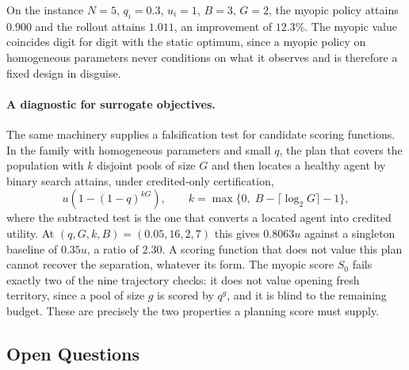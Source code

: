 On the instance $N=5$, $q_i=0.3$, $u_i=1$, $B=3$, $G=2$, the myopic policy
attains $0.900$ and the rollout attains $1.011$, an improvement of $12.3\%$. The
myopic value coincides digit for digit with the static optimum, since a myopic
policy on homogeneous parameters never conditions on what it observes and is
therefore a fixed design in disguise.

\paragraph{A diagnostic for surrogate objectives.}
The same machinery supplies a falsification test for candidate scoring
functions. In the family with homogeneous parameters and small $q$, the plan
that covers the population with $k$ disjoint pools of size $G$ and then locates a
healthy agent by binary search attains, under credited-only certification,
\[
  u\left(1-(1-q)^{kG}\right),
  \qquad k=\max\{0,\;B-\lceil\log_2 G\rceil-1\},
\]
where the subtracted test is the one that converts a located agent into credited
utility. At $(q,G,k,B)=(0.05,16,2,7)$ this gives $0.8063u$ against a singleton
baseline of $0.35u$, a ratio of $2.30$. A scoring function that does not value
this plan cannot recover the separation, whatever its form. The myopic score
$S_0$ fails exactly two of the nine trajectory checks: it does not value opening
fresh territory, since a pool of size $g$ is scored by $q^{g}$, and it is blind
to the remaining budget. These are precisely the two properties a planning
score must supply.

\subsection{Open Questions}
\label{sec:anatomy-open}

